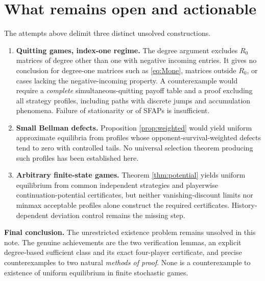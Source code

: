 \documentclass[11pt,a4paper]{article}
\theoremstyle{definition}
\theoremstyle{remark}
\begin{document}
\section{What remains open and actionable}\label{sec:frontier}
The attempts above delimit three distinct unsolved constructions.
\begin{enumerate}[leftmargin=*]
\item \textbf{Quitting games, index-one regime.} The degree argument excludes $R_0$ matrices of degree other than one with negative incoming entries. It gives no conclusion for degree-one matrices such as \eqref{eq:Mone}, matrices outside $R_0$, or cases lacking the negative-incoming property. A counterexample would require a \emph{complete} simultaneous-quitting payoff table and a proof excluding all strategy profiles, including paths with discrete jumps and accumulation phenomena. Failure of stationarity or of SFAPs is insufficient.
\item \textbf{Small Bellman defects.} Proposition \ref{prop:weighted} would yield uniform approximate equilibria from profiles whose opponent-survival-weighted defects tend to zero with controlled tails. No universal selection theorem producing such profiles has been established here.
\item \textbf{Arbitrary finite-state games.} Theorem \ref{thm:potential} yields uniform equilibrium from common independent strategies and playerwise continuation-potential certificates, but neither vanishing-discount limits nor minmax acceptable profiles alone construct the required certificates. History-dependent deviation control remains the missing step.
\end{enumerate}

\textbf{Final conclusion.} The unrestricted existence problem remains unsolved in this note. The genuine achievements are the two verification lemmas, an explicit degree-based sufficient class and its exact four-player certificate, and precise counterexamples to two natural \emph{methods of proof}. None is a counterexample to existence of uniform equilibrium in finite stochastic games.

\appendix
\end{document}
